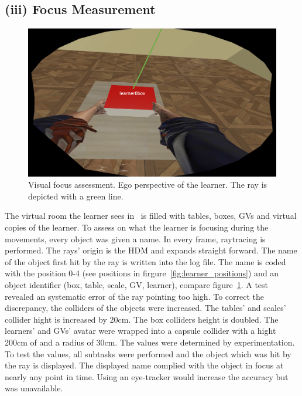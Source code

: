 \subsection{(iii) Focus Measurement}
\label{sec:rayTrace}
\begin{figure}[H]
	\centering
	\includegraphics[width=\textwidth]{figures/focus.png}
	\caption[Focus assessment]{Visual focus assessment. Ego perspective of the learner. The ray is depicted with a green line.}
	\label{fig:focusAssessment}
\end{figure}
The virtual room the learner sees in \exgo\ is filled with tables, boxes, GVs and virtual copies of the learner. To assess on what the learner is focusing during the movements, every object was given a name. In every frame, raytracing is performed. The rays' origin is the HDM and expands straight forward. The name of the object first hit by the ray is written into the log file. The name is coded with the position 0-4 (see positions in firgure~\ref{fig:learner_positions}) and an object identifier (box, table, scale, GV, learner), compare figure~\ref{fig:focusAssessment}. A test revealed an systematic error of the ray pointing too high. To correct the discrepancy, the colliders of the objects were increased. The tables' and scales' collider hight is increased by 20cm. The box colliders height is doubled. The learners' and GVs' avatar were wrapped into a capsule collider with a hight 200cm of and a radius of 30cm. The values were determined by experimentation. To test the values, all subtasks were performed and the object which was hit by the ray is displayed. The displayed name complied with the object in focus at nearly any point in time. Using an eye-tracker would increase the accuracy but was unavailable.


